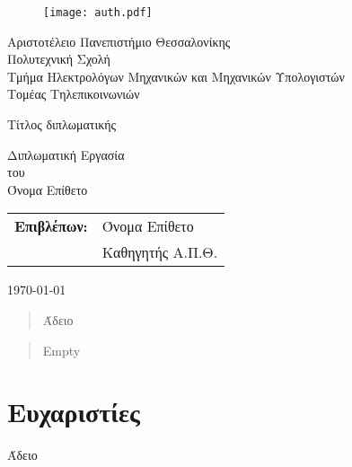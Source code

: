 \begin{titlepage}

\begin{figure}[H]
  \begin{center}
    \texttt{[image: auth.pdf]}
    \label{fig:cover_auth_logo}
  \end{center}
\end{figure}

\centering
\Large Αριστοτέλειο Πανεπιστήμιο Θεσσαλονίκης\\
\Large Πολυτεχνική Σχολή\\
\large Τμήμα Ηλεκτρολόγων Μηχανικών και Μηχανικών Υπολογιστών\\
\large Τομέας Τηλεπικοινωνιών

\vspace{\fill}

\LARGE Τίτλος διπλωματικής

\vspace{\fill}

\Large Διπλωματική Εργασία\\
\Large του\\
\Large Όνομα Επίθετο

\vspace{\fill}
\raggedright

\begin{tabular}{ll}
\textbf{Επιβλέπων:} & Όνομα Επίθετο\\
 & Καθηγητής Α.Π.Θ.\\
\end{tabular}

\centering
\vspace{\fill}
\today

\end{titlepage}

\begin{abstract}
Άδειο
\end{abstract}

\begin{abstract}
Empty
\end{abstract}

\thispagestyle{empty}


\section*{Ευχαριστίες}
\thispagestyle{empty}

Άδειο

\clearpage
